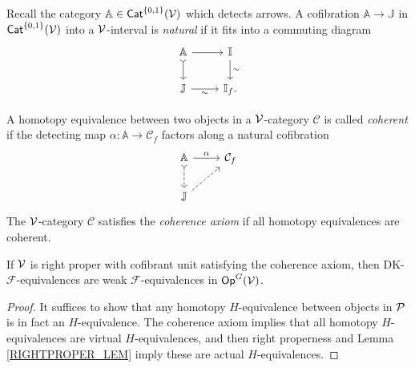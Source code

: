 \documentclass[a4paper,10pt
]{article}%
\renewcommand{\F}{\mathcal F}
\newcommand{\I}{\mathbb I}
\newcommand{\J}{\mathbb J}
\renewcommand{\1}{\ensuremath{\mathbb{id}}}
\begin{document}
\begin{definition}
      Recall the category $\mathbb A \in \Cat^{\set{0,1}}(\V)$ which detects arrows.
      A cofibration $\mathbb A \to \J$ in $\Cat^{\set{0,1}}(\V)$ into a $\V$-interval is \textit{natural} if
      it fits into a commuting diagram
      \begin{equation}
            \begin{tikzcd}
                  \mathbb A \arrow[d, tail] \arrow[r]
                  &
                  \I \arrow[d, "\sim"]
                  \\
                  \J \arrow[r, "\sim"']
                  &
                  \I_f.
            \end{tikzcd}
      \end{equation}

      A homotopy equivalence between two objects in a $\V$-category $\mathcal C$ is called \textit{coherent} if
      the detecting map $\alpha: \mathbb A \to \mathcal C_f$ factors along a natural cofibration
      \begin{equation}
            \begin{tikzcd}
                  \mathbb A \arrow[r, "\alpha"] \arrow[d, tail, dashed]
                  &
                  \mathcal C_f
                  \\
                  \J \arrow[ur, dashed]
            \end{tikzcd}
      \end{equation}
      The $\V$-category $\mathcal C$ satisfies the \textit{coherence axiom} if all homotopy equivalences are coherent.
\end{definition}

\begin{proposition}
      If $\V$ is right proper with cofibrant unit satisfying the coherence axiom, then
      DK-$\F$-equivalences are weak $\F$-equivalences in $\Op^G(\V)$.
\end{proposition}
\begin{proof}
      It suffices to show that any homotopy $H$-equivalence between objects in $\P$ is in fact an $H$-equivalence.
      The coherence axiom implies that all homotopy $H$-equivalences are virtual $H$-equivalences, and then
      right properness and Lemma \ref{RIGHTPROPER_LEM} imply these are actual $H$-equivalences.
\end{proof}




\end{document}
